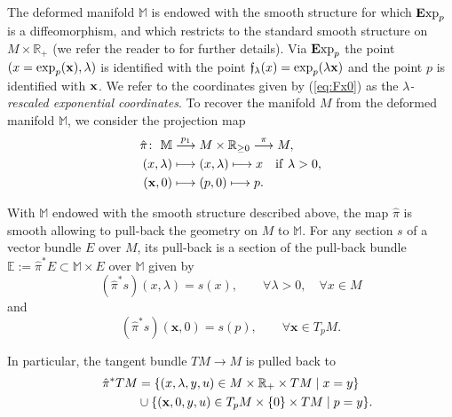 \documentclass[10pt,a4paper]{amsart}
\numberwithin{equation}{section}
\theoremstyle{definition}
\newcommand{\R}{\mathbb R}
\newcommand{\M}{\mathbb M}
\newcommand{\E}{\mathbb E}
\newcommand{\Exp}{{\mathbf E}{\rm xp}}
\def \bui#1#2{\mathrel{\mathop{\kern 0pt#1}\limits^{#2}}}
\begin{document}
The deformed manifold $\M$ is endowed with the smooth structure for which $\Exp_{p}$ is a diffeomorphism, and which restricts to the standard smooth structure on {$M\times \R_+$} (we refer the reader to \cite[above Lemma~4.3]{H} for further details). Via $\Exp_p$ the point $(x=\exp_p({\bf x}), \lambda)$ is identified with the point $\mathfrak{f}_\lambda(x)={\rm exp}_p(\lambda {\bf x})$ and the point $p$ is identified with ${\bf x}$. We refer to the coordinates given by (\ref{eq:Fx0}) as the {\it $\lambda$-rescaled exponential coordinates}. To recover the manifold $M$ from the deformed manifold $\M$, we consider the projection map
\begin{align*}
\hat \pi\colon \ \M & \bui{\longrightarrow}{p_1} M\times\R_{\geq 0} \bui{\longrightarrow}{\pi} M,\\
(x, \lambda)& \longmapsto (x, \lambda) \longmapsto x \quad {\rm if} \ \lambda>0, \\
({\mathbf x},0) & \longmapsto (p,0) \longmapsto p.
\end{align*}

With $\M$ endowed with the smooth structure described above, the map $\hat\pi$ is smooth allowing to pull-back the geometry on $M$ to $\M$. For any section $s$ of a vector bundle $E$ over $M$, its pull-back is a section of the pull-back bundle $\E:=\hat \pi^* E\subset \M\times E$ over $\M$ given by
\[
(\hat\pi^* s)(x,\lambda)=s(x),\qquad \forall \lambda>0 ,\quad \forall x\in M
\]
and
\[
(\hat\pi^* s)({\mathbf x},0)=s(p),\qquad \forall {\mathbf x}\in T_pM.
\]

In particular, the tangent bundle $TM\to M$ is pulled back to
\begin{gather*}
\hat \pi^* TM=\{(x,\lambda,y,u)\in M\times\R_+\times TM\mid x=y\}\\
\hphantom{\hat \pi^* TM=}{}
\cup \{({\bf x},0,y,u)\in T_pM\times \{0\}\times TM\mid p=y\}.
\end{gather*}
\end{document}
